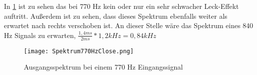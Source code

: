 In \cref{fig:Spekt770Close} ist zu sehen das bei 770 Hz kein oder nur ein sehr schwacher Leck-Effekt auftritt. Außerdem ist zu sehen, dass dieses Spektrum ebenfalls weiter als erwartet nach rechts verschoben ist. An dieser Stelle wäre das Spektrum eines 840 Hz Signals zu erwarten, \begin{math} \frac{1,4ms}{2ms} * 1,2 kHz = 0,84 kHz \end{math}
\begin{figure}[H]
	\texttt{[image: Spektrum770HzClose.png]}
  \caption{Ausgangsspektrum bei einem 770 Hz Eingangssignal}
  \label{fig:Spekt770Close}
\end{figure}